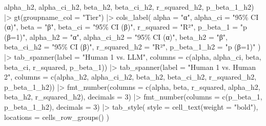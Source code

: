 \documentclass[
  letterpaper,
  DIV=11,
  numbers=noendperiod]{scrartcl}
\newenvironment{Shaded}{\begin{snugshade}}{\end{snugshade}}
\newcommand{\AttributeTok}[1]{\textcolor[rgb]{0.40,0.45,0.13}{#1}}
\newcommand{\DecValTok}[1]{\textcolor[rgb]{0.68,0.00,0.00}{#1}}
\newcommand{\FunctionTok}[1]{\textcolor[rgb]{0.28,0.35,0.67}{#1}}
\newcommand{\NormalTok}[1]{\textcolor[rgb]{0.00,0.23,0.31}{#1}}
\newcommand{\SpecialCharTok}[1]{\textcolor[rgb]{0.37,0.37,0.37}{#1}}
\newcommand{\StringTok}[1]{\textcolor[rgb]{0.13,0.47,0.30}{#1}}
\begin{document}
\begin{Shaded}
\begin{Highlighting}[]
\NormalTok{         alpha\_h2, alpha\_ci\_h2, beta\_h2, beta\_ci\_h2, r\_squared\_h2, p\_beta\_1\_h2) }\SpecialCharTok{|\textgreater{}}
  \FunctionTok{gt}\NormalTok{(}\AttributeTok{groupname\_col =} \StringTok{"Tier"}\NormalTok{) }\SpecialCharTok{|\textgreater{}}
  \FunctionTok{cols\_label}\NormalTok{(}
    \AttributeTok{alpha =} \StringTok{"α"}\NormalTok{, }\AttributeTok{alpha\_ci =} \StringTok{"95\% CI (α)"}\NormalTok{, }\AttributeTok{beta =} \StringTok{"β"}\NormalTok{, }\AttributeTok{beta\_ci =} \StringTok{"95\% CI (β)"}\NormalTok{,}
    \AttributeTok{r\_squared =} \StringTok{"R²"}\NormalTok{, }\AttributeTok{p\_beta\_1 =} \StringTok{"p (β=1)"}\NormalTok{,}
    \AttributeTok{alpha\_h2 =} \StringTok{"α"}\NormalTok{, }\AttributeTok{alpha\_ci\_h2 =} \StringTok{"95\% CI (α)"}\NormalTok{, }\AttributeTok{beta\_h2 =} \StringTok{"β"}\NormalTok{, }\AttributeTok{beta\_ci\_h2 =} \StringTok{"95\% CI (β)"}\NormalTok{,}
    \AttributeTok{r\_squared\_h2 =} \StringTok{"R²"}\NormalTok{, }\AttributeTok{p\_beta\_1\_h2 =} \StringTok{"p (β=1)"}
\NormalTok{  ) }\SpecialCharTok{|\textgreater{}}
  \FunctionTok{tab\_spanner}\NormalTok{(}\AttributeTok{label =} \StringTok{"Human 1 vs. LLM"}\NormalTok{,}
              \AttributeTok{columns =} \FunctionTok{c}\NormalTok{(alpha, alpha\_ci, beta, beta\_ci, r\_squared, p\_beta\_1)) }\SpecialCharTok{|\textgreater{}}
  \FunctionTok{tab\_spanner}\NormalTok{(}\AttributeTok{label =} \StringTok{"Human 1 vs. Human 2"}\NormalTok{,}
              \AttributeTok{columns =} \FunctionTok{c}\NormalTok{(alpha\_h2, alpha\_ci\_h2, beta\_h2, beta\_ci\_h2, r\_squared\_h2, p\_beta\_1\_h2)) }\SpecialCharTok{|\textgreater{}}
  \FunctionTok{fmt\_number}\NormalTok{(}\AttributeTok{columns =} \FunctionTok{c}\NormalTok{(alpha, beta, r\_squared, alpha\_h2, beta\_h2, r\_squared\_h2), }\AttributeTok{decimals =} \DecValTok{3}\NormalTok{) }\SpecialCharTok{|\textgreater{}}
  \FunctionTok{fmt\_number}\NormalTok{(}\AttributeTok{columns =} \FunctionTok{c}\NormalTok{(p\_beta\_1, p\_beta\_1\_h2), }\AttributeTok{decimals =} \DecValTok{3}\NormalTok{) }\SpecialCharTok{|\textgreater{}}
  \FunctionTok{tab\_style}\NormalTok{(}
    \AttributeTok{style     =} \FunctionTok{cell\_text}\NormalTok{(}\AttributeTok{weight =} \StringTok{"bold"}\NormalTok{),}
    \AttributeTok{locations =} \FunctionTok{cells\_row\_groups}\NormalTok{()}
\NormalTok{  )}
\end{Highlighting}
\end{Shaded}
\end{document}
